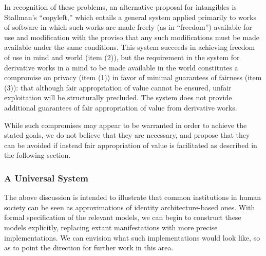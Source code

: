 \documentclass[pra,twocolumn,groupedaddress,10pt]{revtex4}
\theoremstyle{definition}
\begin{document}
In recognition of these problems, an alternative proposal for intangibles is Stallman's ``copyleft,''\cite{stallmancopyleft} which entails a general system applied primarily to works of software in which such works are made freely (as in ``freedom'') available for use and modification with the proviso that any such modifications must be made available under the same conditions. This system succeeds in achieving freedom of use in mind and world (item (2)), but the requirement in the system for derivative works in a mind to be made available in the world constitutes a compromise on privacy (item (1)) in favor of minimal guarantees of fairness (item (3)): that although fair appropriation of value cannot be ensured, unfair exploitation will be structurally precluded. The system does not provide additional guarantees of fair appropriation of value from derivative works.

While such compromises may appear to be warranted in order to achieve the stated goals, we do not believe that they are necessary, and propose that they can be avoided if instead fair appropriation of value is facilitated as described in the following section.

\subsubsection{A Universal System}

The above discussion is intended to illustrate that common institutions in human society can be seen as approximations of identity architecture-based ones. With formal specification of the relevant models, we can begin to construct these models explicitly, replacing extant manifestations with more precise implementations. We can envision what such implementations would look like, so as to point the direction for further work in this area.

\end{document}
